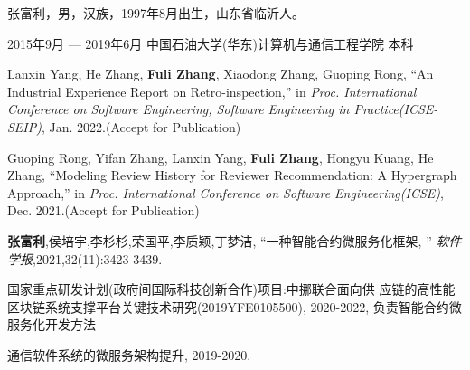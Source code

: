 \documentclass[macfonts,master,oneside]{njuthesis}
\begin{document}
\backmatter
\begin{resume}
  \begin{authorinfo}
    \noindent 张富利，男，汉族，1997年8月出生，山东省临沂人。
  \end{authorinfo}
  \begin{education}
    \item[2015年9月 --- 2019年6月] 中国石油大学(华东)计算机与通信工程学院 \hfill 本科
  \end{education}
  \begin{publications}

      \item Lanxin Yang, He Zhang, \textbf{Fuli Zhang}, Xiaodong Zhang, Guoping Rong, ``An Industrial Experience Report on Retro-inspection,'' in \textsl{Proc. International Conference on Software Engineering, Software Engineering in Practice(ICSE-SEIP)}, Jan. 2022.(Accept for Publication)

      \item Guoping Rong, Yifan Zhang, Lanxin Yang, \textbf{Fuli Zhang}, Hongyu Kuang, He Zhang, ``Modeling Review History for Reviewer Recommendation: A Hypergraph Approach,'' in \textsl{Proc. International Conference on Software Engineering(ICSE)}, Dec. 2021.(Accept for Publication)

      \item \textbf{张富利},侯培宇,李杉杉,荣国平,李质颖,丁梦洁, ``一种智能合约微服务化框架, '' \textsl{软件学报},2021,32(11):3423-3439.

  \end{publications}
 

  \begin{projects}
    \item 国家重点研发计划(政府间国际科技创新合作)项目:中挪联合面向供
应链的高性能区块链系统支撑平台关键技术研究(2019YFE0105500), 2020-2022, 负责智能合约微服务化开发方法
    \item 通信软件系统的微服务架构提升, 2019-2020.

  \end{projects}
\end{resume}


\end{document}
